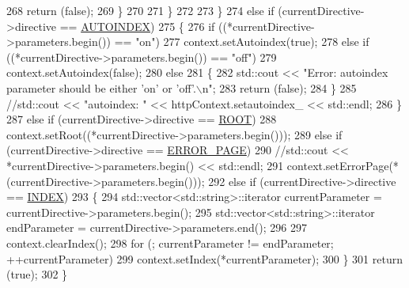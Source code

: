 \begin{DoxyCode}
268                     \textcolor{keywordflow}{return} (\textcolor{keyword}{false});
269                 \}
270 
271             \}
272 
273         \}
274         \textcolor{keywordflow}{else} \textcolor{keywordflow}{if} (currentDirective->directive == \hyperlink{namespaceft_a5a5554dff10f0dc50bae4cc5825ad75da8ce880864e00bec4865ba027e32a466c}{AUTOINDEX})
275         \{
276             \textcolor{keywordflow}{if} ((*currentDirective->parameters.begin()) == \textcolor{stringliteral}{"on"})
277                 context.setAutoindex(\textcolor{keyword}{true});
278             \textcolor{keywordflow}{else} \textcolor{keywordflow}{if} ((*currentDirective->parameters.begin()) == \textcolor{stringliteral}{"off"})
279                 context.setAutoindex(\textcolor{keyword}{false});
280             \textcolor{keywordflow}{else}
281             \{
282                 std::cout << \textcolor{stringliteral}{"Error: autoindex parameter should be either 'on' or 'off'.\(\backslash\)n"};
283                 \textcolor{keywordflow}{return} (\textcolor{keyword}{false});
284             \}
285             \textcolor{comment}{//std::cout << "autoindex: " << httpContext.setautoindex\_ << std::endl;}
286         \}
287         \textcolor{keywordflow}{else} \textcolor{keywordflow}{if} (currentDirective->directive == \hyperlink{namespaceft_a5a5554dff10f0dc50bae4cc5825ad75dad41208b99e347d1726824779b11ea11b}{ROOT})
288             context.setRoot((*currentDirective->parameters.begin()));
289         \textcolor{keywordflow}{else} \textcolor{keywordflow}{if} (currentDirective->directive == \hyperlink{namespaceft_a5a5554dff10f0dc50bae4cc5825ad75da69c9592b502329f43c77ad043a13e6d9}{ERROR\_PAGE})
290             \textcolor{comment}{//std::cout << *currentDirective->parameters.begin() << std::endl;}
291             context.setErrorPage(*(currentDirective->parameters.begin()));
292         \textcolor{keywordflow}{else} \textcolor{keywordflow}{if} (currentDirective->directive == \hyperlink{namespaceft_a5a5554dff10f0dc50bae4cc5825ad75da5f0c05bad71a7b0dd266aae7ce4b3579}{INDEX})
293         \{
294             std::vector<std::string>::iterator  currentParameter = currentDirective->parameters.begin();
295             std::vector<std::string>::iterator      endParameter = currentDirective->parameters.end();
296 
297             context.clearIndex();
298             \textcolor{keywordflow}{for} (; currentParameter != endParameter; ++currentParameter)
299                 context.setIndex(*currentParameter);
300         \}
301         \textcolor{keywordflow}{return} (\textcolor{keyword}{true});
302     \}
\end{DoxyCode}
